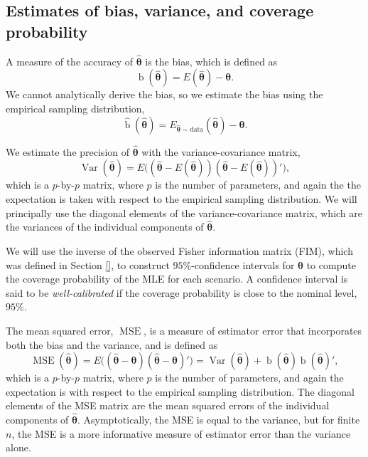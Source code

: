 \documentclass[
]{article}
\begin{document}
\hypertarget{sec:acc_prec}{%
\subsection{Estimates of bias, variance, and coverage
probability}\label{sec:acc_prec}}

A measure of the accuracy of \(\boldsymbol{\hat\theta}\) is the bias,
which is defined as \[
\operatorname{b}(\boldsymbol{\hat\theta}) = E(\boldsymbol{\hat\theta}) - \boldsymbol{\theta}.
\] We cannot analytically derive the bias, so we estimate the bias using
the empirical sampling distribution, \[
\hat{\operatorname{b}}(\boldsymbol{\hat\theta}) =
    E_{\hat{\boldsymbol{\theta}} \sim \text{data}}(\boldsymbol{\hat\theta}) - \boldsymbol{\theta}.
\]

We estimate the precision of \(\boldsymbol{\hat\theta}\) with the
variance-covariance matrix, \[
\operatorname{Var}(\boldsymbol{\hat\theta}) =
    E\bigl(
        (\hat{\boldsymbol{\theta}} - E(\hat{\boldsymbol{\theta}}))
        (\hat{\boldsymbol{\theta}} - E(\hat{\boldsymbol{\theta}}))'
    \bigr),
\] which is a \(p\)-by-\(p\) matrix, where \(p\) is the number of
parameters, and again the the expectation is taken with respect to the
empirical sampling distribution. We will principally use the diagonal
elements of the variance-covariance matrix, which are the variances of
the individual components of \(\boldsymbol{\hat\theta}\).

We will use the inverse of the observed Fisher information matrix (FIM),
which was defined in Section \ref{}, to construct \(95\%\)-confidence
intervals for \(\boldsymbol{\theta}\) to compute the coverage
probability of the MLE for each scenario. A confidence interval is said
to be \emph{well-calibrated} if the coverage probability is close to the
nominal level, \(95\%\).

The mean squared error, \(\operatorname{MSE}\), is a measure of
estimator error that incorporates both the bias and the variance, and is
defined as \[
\operatorname{MSE}(\boldsymbol{\hat\theta}) =
    E\bigl((\boldsymbol{\hat\theta} - \boldsymbol{\theta})(\boldsymbol{\hat\theta} - \boldsymbol{\theta})'\bigr) =
    \operatorname{Var}(\boldsymbol{\hat\theta}) +
    \operatorname{b}(\boldsymbol{\hat\theta})\operatorname{b}(\boldsymbol{\hat\theta})',
\] which is a \(p\)-by-\(p\) matrix, where \(p\) is the number of
parameters, and again the expectation is with respect to the empirical
sampling distribution. The diagonal elements of the MSE matrix are the
mean squared errors of the individual components of
\(\boldsymbol{\hat\theta}\). Asymptotically, the MSE is equal to the
variance, but for finite \(n\), the MSE is a more informative measure of
estimator error than the variance alone.
\end{document}
